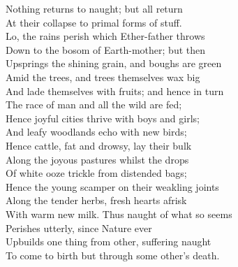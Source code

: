 Nothing returns to naught; but all return\\
At their collapse to primal forms of stuff.\\
Lo, the rains perish which Ether-father throws\\
Down to the bosom of Earth-mother; but then\\
Upsprings the shining grain, and boughs are green\\
Amid the trees, and trees themselves wax big\\
And lade themselves with fruits; and hence in turn\\
The race of man and all the wild are fed;\\
Hence joyful cities thrive with boys and girls;\\
And leafy woodlands echo with new birds;\\
Hence cattle, fat and drowsy, lay their bulk\\
Along the joyous pastures whilst the drops\\
Of white ooze trickle from distended bags;\\
Hence the young scamper on their weakling joints\\
Along the tender herbs, fresh hearts afrisk\\
With warm new milk. Thus naught of what so seems\\
Perishes utterly, since Nature ever\\
Upbuilds one thing from other, suffering naught\\
To come to birth but through some other's death.


